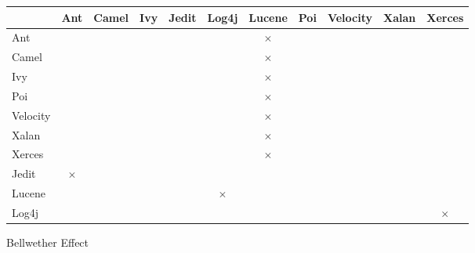 \begin{figure*}[t!]
{\scriptsize 
\centering
\caption{Bellwether Effect}
\label{res:jur}
\begin{tabular}{l|c|l|l|l|c|c|l|l|l|c}
         & Ant & Camel & Ivy & Jedit & Log4j & Lucene & Poi & Velocity & Xalan & Xerces                 \\ \hline
Ant      &     &       &     &       &       & $\times$     &     &          &       & \multicolumn{1}{c}{}  \\ \hline
Camel    &     &       &     &       &       & $\times$     &     &          &       & \multicolumn{1}{c}{}  \\ \hline
Ivy      &     &       &     &       &       & $\times$     &     &          &       & \multicolumn{1}{c}{}  \\ \hline
Poi      &     &       &     &       &       & $\times$     &     &          &       & \multicolumn{1}{c}{}  \\ \hline
Velocity &     &       &     &       &       & $\times$     &     &          &       & \multicolumn{1}{c}{}  \\ \hline
Xalan    &     &       &     &       &       & $\times$     &     &          &       & \multicolumn{1}{c}{}  \\ \hline
Xerces   &     &       &     &       &       & $\times$     &     &          &       & \multicolumn{1}{c}{}  \\ \hline
Jedit    & $\times$  &       &     &       &       &        &     &          &       & \multicolumn{1}{c}{}  \\ \hline
Lucene   &     &       &     &       & $\times$    &        &     &          &       & \multicolumn{1}{c}{}  \\ \hline
Log4j    &     &       &     &       &       &        &     &          &       & \multicolumn{1}{c}{$\times$}
\end{tabular}}
\end{figure*}